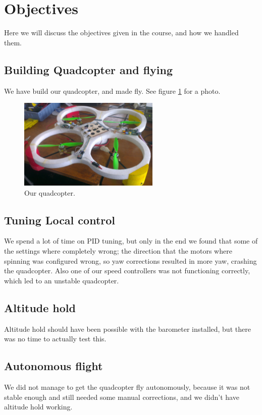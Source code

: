 \documentclass[11pt, a4paper, onecolumn, oneside, parskip=half]{scrartcl}
\begin{document}
\section{Objectives}
\label{sec:objectives}
Here we will discuss the objectives given in the course, and how we handled them.

\subsection{Building Quadcopter and flying}
\label{sec:objectives:building}
We have build our quadcopter, and made fly. See figure \ref{fig:quad} for a photo.

\begin{figure}[ht]
\centering
\includegraphics[width=0.6\textwidth]{quad}
\caption{Our quadcopter.}
\label{fig:quad}
\end{figure}

\subsection{Tuning Local control}
\label{sec:objectives:tuning}
We spend a lot of time on PID tuning, but only in the end we found that some of the settings where completely wrong; the direction that the motors where spinning was configured wrong, so yaw corrections resulted in more yaw, crashing the quadcopter. Also one of our speed controllers was not functioning correctly, which led to an unstable quadcopter.

\subsection{Altitude hold}
\label{sec:objectives:altitude}
Altitude hold should have been possible with the barometer installed, but there was no time to actually test this.

\subsection{Autonomous flight}
\label{sec:objectives:autonomous}
We did not manage to get the quadcopter fly autonomously, because it was not stable enough and still needed some manual corrections, and we didn't have altitude hold working.
\end{document}

